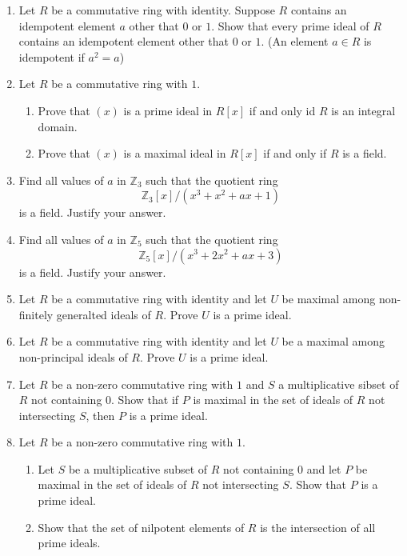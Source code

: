 \documentclass{article}
\theoremstyle{definition}
\newcommand{\Z}{\mathbb{Z}}
\begin{document}
\begin{enumerate}
            \item Let $R$ be a commutative ring with identity. Suppose $R$ contains an idempotent element $a$ other that $0$ or $1$. Show that every prime ideal of $R$ contains an idempotent element other that $0$ or $1$. (An element $a\in R$ is idempotent if $a^2=a$)
            
            \item Let $R$ be a commutative ring with $1$.
                
                \begin{enumerate}
                    \item Prove that $(x)$ is a prime ideal in $R[x]$ if and only id $R$ is an integral domain.
                    \item Prove that $(x)$ is a maximal ideal in $R[x]$ if and only if $R$ is a field.
                \end{enumerate}
            
            \item Find all values of $a$ in $\Z_3$ such that the quotient ring \[\Z_3[x]/(x^3+x^2+ax+1)\] is a field. Justify your answer.
            
            \item Find all values of $a$ in $\Z_5$ such that the quotient ring \[\Z_5[x]/(x^3+2x^2+ax+3)\] is a field. Justify your answer.
            
            \item Let $R$ be a commutative ring with identity and let $U$ be maximal among non-finitely generalted ideals of $R$. Prove $U$ is a prime ideal.
            
            \item Let $R$ be a commutative ring with identity and let $U$ be a maximal among non-principal ideals of $R$. Prove $U$ is a prime ideal. 
            
            \item Let $R$ be a non-zero commutative ring with $1$ and $S$ a multiplicative sibset of $R$ not containing $0$. Show that if $P$ is maximal in the set of ideals of $R$ not intersecting $S$, then $P$ is a prime ideal.
            
            \item Let $R$ be a non-zero commutative ring with $1$. 
                
                \begin{enumerate}
                    \item Let $S$ be a multiplicative subset of $R$ not containing $0$ and let $P$ be maximal in the set of ideals of $R$ not intersecting $S$. Show that $P$ is a prime ideal.
                    \item Show that the set of nilpotent elements of $R$ is the intersection of all prime ideals.
                \end{enumerate}
            

\end{enumerate}
\end{document}
